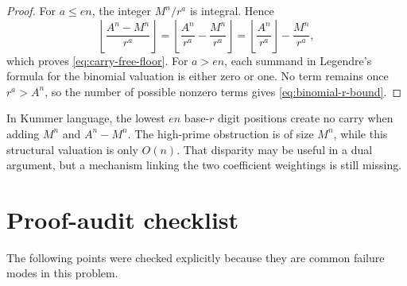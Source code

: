 \documentclass[11pt,oneside]{article}
\theoremstyle{definition}
\theoremstyle{remark}
\begin{document}
\begin{proof}
For $a\le en$, the integer $M^n/r^a$ is integral.  Hence
\[
 \left\lfloor\frac{A^n-M^n}{r^a}\right\rfloor
 =\left\lfloor\frac{A^n}{r^a}-\frac{M^n}{r^a}\right\rfloor
 =\left\lfloor\frac{A^n}{r^a}\right\rfloor-\frac{M^n}{r^a},
\]
which proves \eqref{eq:carry-free-floor}.  For $a>en$, each summand in Legendre's formula for
the binomial valuation is either zero or one.  No term remains once $r^a>A^n$, so the number
of possible nonzero terms gives \eqref{eq:binomial-r-bound}.
\end{proof}

In Kummer language, the lowest $en$ base-$r$ digit positions create no carry when adding
$M^n$ and $A^n-M^n$.  The high-prime obstruction is of size $M^n$, while this structural
valuation is only $O(n)$.  That disparity may be useful in a dual argument, but a mechanism
linking the two coefficient weightings is still missing.

\section{Proof-audit checklist}
\label{app:audit}

The following points were checked explicitly because they are common failure modes in this
problem.
\end{document}
